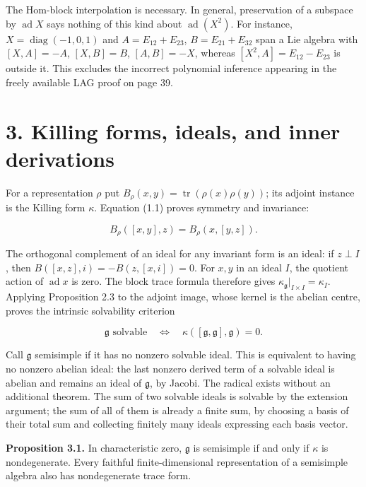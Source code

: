\documentclass[11pt,a4paper,openany]{report}
\begin{document}
The Hom-block interpolation is necessary. In general, preservation of a subspace by \(\operatorname{ad}X\) says nothing of this kind about \(\operatorname{ad}(X^2)\). For instance, \(X=\operatorname{diag}(-1,0,1)\) and \(A=E_{12}+E_{23}\), \(B=E_{21}+E_{32}\) span a Lie algebra with \([X,A]=-A\), \([X,B]=B\), \([A,B]=-X\), whereas \([X^2,A]=E_{12}-E_{23}\) is outside it. This excludes the incorrect polynomial inference appearing in the freely available LAG proof on page 39.

\section{3. Killing forms, ideals, and inner derivations}\label{AG-RG-S06-killing-forms-ideals-and-inner-derivations}

For a representation \(\rho\) put \(B_\rho(x,y)=\operatorname{tr}(\rho(x)\rho(y))\); its adjoint instance is the Killing form \(\kappa\). Equation (1.1) proves symmetry and invariance:

\[
B_\rho([x,y],z)=B_\rho(x,[y,z]).
\tag{3.1}
\]

The orthogonal complement of an ideal for any invariant form is an ideal: if \(z\perp I\), then \(B([x,z],i)=-B(z,[x,i])=0\). For \(x,y\) in an ideal \(I\), the quotient action of \(\operatorname{ad}x\) is zero. The block trace formula therefore gives \(\kappa_{\mathfrak g}|_{I\times I}=\kappa_I\). Applying Proposition 2.3 to the adjoint image, whose kernel is the abelian centre, proves the intrinsic solvability criterion

\[
\mathfrak g\text{ solvable}
\quad\Longleftrightarrow\quad
\kappa([\mathfrak g,\mathfrak g],\mathfrak g)=0.
\tag{3.2}
\]

Call \(\mathfrak g\) semisimple if it has no nonzero solvable ideal. This is equivalent to having no nonzero abelian ideal: the last nonzero derived term of a solvable ideal is abelian and remains an ideal of \(\mathfrak g\), by Jacobi. The radical exists without an additional theorem. The sum of two solvable ideals is solvable by the extension argument; the sum of all of them is already a finite sum, by choosing a basis of their total sum and collecting finitely many ideals expressing each basis vector.

\textbf{Proposition 3.1.} In characteristic zero, \(\mathfrak g\) is semisimple if and only if \(\kappa\) is nondegenerate. Every faithful finite-dimensional representation of a semisimple algebra also has nondegenerate trace form.
\end{document}
